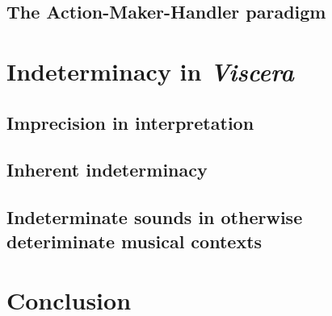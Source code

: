 \documentclass[11pt]{article}
\begin{document}
\subsection{The Action-Maker-Handler paradigm}

\section{Indeterminacy in \textit{Viscera}}
\subsection{Imprecision in interpretation}
\subsection{Inherent indeterminacy}
\subsection{Indeterminate sounds in otherwise deteriminate musical contexts}

\section{Conclusion}
\end{document}
